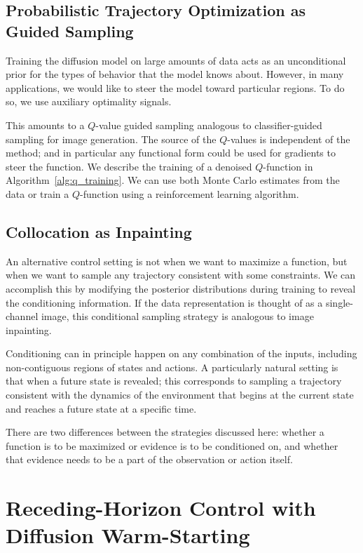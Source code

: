 \subsection{Probabilistic Trajectory Optimization as Guided Sampling}
Training the diffusion model on large amounts of data acts as an unconditional prior for the types of behavior that the model knows about.
However, in many applications, we would like to steer the model toward particular regions.
To do so, we use auxiliary optimality signals.


This amounts to a $Q$-value guided sampling analogous to classifier-guided sampling for image generation.
The source of the $Q$-values is independent of the method; and in particular any functional form could be used for gradients to steer the function.
We describe the training of a denoised $Q$-function in Algorithm~\ref{alg:q_training}.
We can use both Monte Carlo estimates from the data or train a $Q$-function using a reinforcement learning algorithm.


\subsection{Collocation as Inpainting}
An alternative control setting is not when we want to maximize a function, but when we want to sample any trajectory consistent with some constraints.
We can accomplish this by modifying the posterior distributions during training to reveal the conditioning information.
If the data representation is thought of as a single-channel image, this conditional sampling strategy is analogous to image inpainting.

Conditioning can in principle happen on any combination of the inputs, including non-contiguous regions of states and actions.
A particularly natural setting is that when a future state is revealed; this corresponds to sampling a trajectory consistent with the dynamics of the environment that begins at the current state and reaches a future state at a specific time.

There are two differences between the strategies discussed here: whether a function is to be maximized or evidence is to be conditioned on, and whether that evidence needs to be a part of the observation or action itself.

\section{Receding-Horizon Control with Diffusion Warm-Starting}

